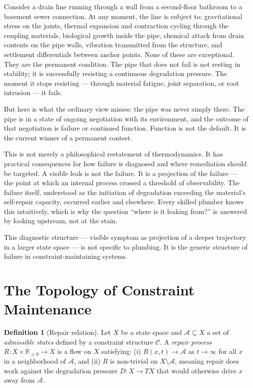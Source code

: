 \documentclass[11pt, a4paper]{article}
\theoremstyle{definition}
\newtheorem{definition}{Definition}
\theoremstyle{remark}
\begin{document}
Consider a drain line running through a wall from a second-floor bathroom to a
basement sewer connection. At any moment, the line is subject to: gravitational
stress on the joints, thermal expansion and contraction cycling through the
coupling materials, biological growth inside the pipe, chemical attack from
drain contents on the pipe walls, vibration transmitted from the structure, and
settlement differentials between anchor points. None of these are exceptional.
They are the permanent condition. The pipe that does not fail is not resting in
stability; it is successfully resisting a continuous degradation pressure. The
moment it stops resisting --- through material fatigue, joint separation, or
root intrusion --- it fails.

But here is what the ordinary view misses: the pipe was never simply there. The
pipe is in a state of ongoing negotiation with its environment, and the outcome
of that negotiation is failure or continued function. Function is not the
default. It is the current winner of a permanent contest.

This is not merely a philosophical restatement of thermodynamics. It has
practical consequences for how failure is diagnosed and where remediation should
be targeted. A visible leak is not the failure. It is a projection of the
failure --- the point at which an internal process crossed a threshold of
observability. The failure itself, understood as the initiation of degradation
exceeding the material's self-repair capacity, occurred earlier and elsewhere.
Every skilled plumber knows this intuitively, which is why the question
``where is it leaking from?'' is answered by looking upstream, not at the stain.

This diagnostic structure --- visible symptom as projection of a deeper
trajectory in a larger state space --- is not specific to plumbing. It is the
generic structure of failure in constraint-maintaining systems.

\section{The Topology of Constraint Maintenance}

\begin{definition}[Repair relation]
Let $X$ be a state space and $\mathcal{A} \subseteq X$ a set of
\textit{admissible states} defined by a constraint structure $\mathcal{C}$.
A \textit{repair process} $R: X \times \mathbb{R}_{\geq 0} \to X$ is a
flow on $X$ satisfying: (i) $R(x, t) \to \mathcal{A}$ as $t \to \infty$
for all $x$ in a neighborhood of $\mathcal{A}$, and (ii) $R$ is non-trivial
on $X \setminus \mathcal{A}$, meaning repair does work against the
degradation pressure $D: X \to TX$ that would otherwise drive $x$
away from $\mathcal{A}$.
\end{definition}
\end{document}
